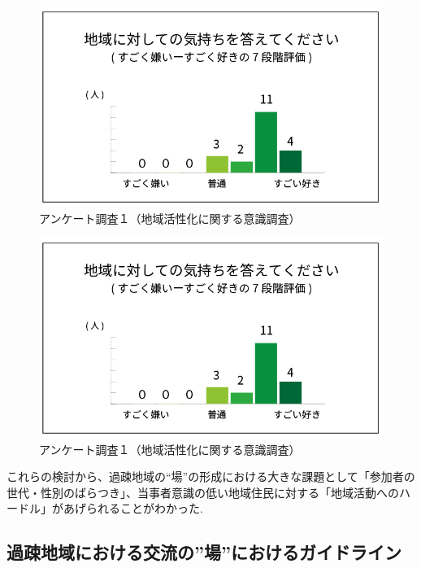 \documentclass[a4paper]{jsarticle}
\begin{document}
\begin{figure}[H]
  \begin{center}
    \includegraphics[width=0.95\hsize]{./images/03}
    \caption{アンケート調査１（地域活性化に関する意識調査）}
    \label{fig:tmu_hino}
  \end{center}
\end{figure}
\begin{figure}[H]
  \begin{center}
    \includegraphics[width=0.95\hsize]{./images/03}
    \caption{アンケート調査１（地域活性化に関する意識調査）}
    \label{fig:tmu_hino}
  \end{center}
\end{figure}


これらの検討から、過疎地域の“場”の形成における大きな課題として「参加者の世代・性別のばらつき」、当事者意識の低い地域住民に対する「地域活動へのハードル」があげられることがわかった.



\subsection{過疎地域における交流の”場”におけるガイドライン}
\end{document}

